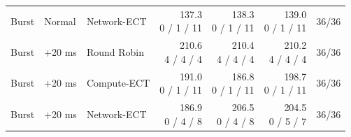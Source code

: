 \begin{table}[H]
\begin{tabular}{lllrrrr}
Burst & Normal & Network-ECT & \shortstack[r]{137.3\\0 / 1 / 11} & \shortstack[r]{138.3\\0 / 1 / 11} & \shortstack[r]{139.0\\0 / 1 / 11} & 36/36 \\
Burst & +20 ms & Round Robin & \shortstack[r]{210.6\\4 / 4 / 4} & \shortstack[r]{210.4\\4 / 4 / 4} & \shortstack[r]{210.2\\4 / 4 / 4} & 36/36 \\
Burst & +20 ms & Compute-ECT & \shortstack[r]{191.0\\0 / 1 / 11} & \shortstack[r]{186.8\\0 / 1 / 11} & \shortstack[r]{198.7\\0 / 1 / 11} & 36/36 \\
Burst & +20 ms & Network-ECT & \shortstack[r]{186.9\\0 / 4 / 8} & \shortstack[r]{206.5\\0 / 4 / 8} & \shortstack[r]{204.5\\0 / 5 / 7} & 36/36 \\
\bottomrule
\end{tabular}
\label{table:scenario-summary:end}
\end{table}
